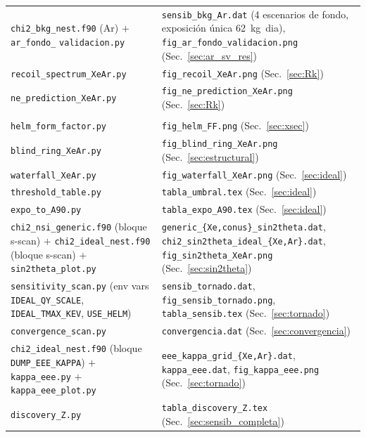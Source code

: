 \documentclass[11pt,a4paper]{article}
\newcommand{\code}[1]{\texttt{#1}}
\begin{document}
\begin{center}
\begin{tabular}{@{}>{\raggedright\arraybackslash}p{4.4cm}>{\raggedright\arraybackslash}p{10.2cm}@{}}
\code{chi2\_bkg\_nest.f90} (Ar) $+$
  \code{ar\_fondo\_} \code{validacion.py} &
  \code{sensib\_bkg\_Ar.dat} (4 escenarios de fondo, exposici\'on \'unica
  \SI{62}{kg.dia}), \code{fig\_ar\_fondo\_validacion.png}
  (Sec.~\ref{sec:ar_sv_res}) \\
\code{recoil\_spectrum\_XeAr.py} & \code{fig\_recoil\_XeAr.png}
  (Sec.~\ref{sec:Rk}) \\
\code{ne\_prediction\_XeAr.py} & \code{fig\_ne\_prediction\_XeAr.png}
  (Sec.~\ref{sec:Rk}) \\
\midrule
\multicolumn{2}{@{}l}{\emph{An\'alisis de sensibilidad (este trabajo)}} \\
\code{helm\_form\_factor.py} & \code{fig\_helm\_FF.png} (Sec.~\ref{sec:xsec}) \\
\code{blind\_ring\_XeAr.py} & \code{fig\_blind\_ring\_XeAr.png} (Sec.~\ref{sec:estructural}) \\
\code{waterfall\_XeAr.py} & \code{fig\_waterfall\_XeAr.png} (Sec.~\ref{sec:ideal}) \\
\code{threshold\_table.py} & \code{tabla\_umbral.tex} (Sec.~\ref{sec:ideal}) \\
\code{expo\_to\_A90.py} & \code{tabla\_expo\_A90.tex} (Sec.~\ref{sec:ideal}) \\
\code{chi2\_nsi\_generic.f90} (bloque s-scan) $+$ \code{chi2\_ideal\_nest.f90}
  (bloque s-scan) $+$ \code{sin2theta\_plot.py} &
  \code{generic\_\{Xe,conus\}\_sin2theta.dat},
  \code{chi2\_sin2theta\_ideal\_\{Xe,Ar\}.dat}, \code{fig\_sin2theta\_XeAr.png}
  (Sec.~\ref{sec:sin2theta}) \\
\code{sensitivity\_scan.py} (env vars \code{IDEAL\_QY\_SCALE},
  \code{IDEAL\_TMAX\_KEV}, \code{USE\_HELM}) &
  \code{sensib\_tornado.dat}, \code{fig\_sensib\_tornado.png},
  \code{tabla\_sensib.tex} (Sec.~\ref{sec:tornado}) \\
\code{convergence\_scan.py} & \code{convergencia.dat}
  (Sec.~\ref{sec:convergencia}) \\
\code{chi2\_ideal\_nest.f90} (bloque \code{DUMP\_EEE\_KAPPA}) $+$
  \code{kappa\_eee.py} $+$ \code{kappa\_eee\_plot.py} &
  \code{eee\_kappa\_grid\_\{Xe,Ar\}.dat}, \code{kappa\_eee.dat},
  \code{fig\_kappa\_eee.png} (Sec.~\ref{sec:tornado}) \\
\code{discovery\_Z.py} & \code{tabla\_discovery\_Z.tex}
  (Sec.~\ref{sec:sensib_completa}) \\
\bottomrule
\end{tabular}
\end{center}
\end{document}
